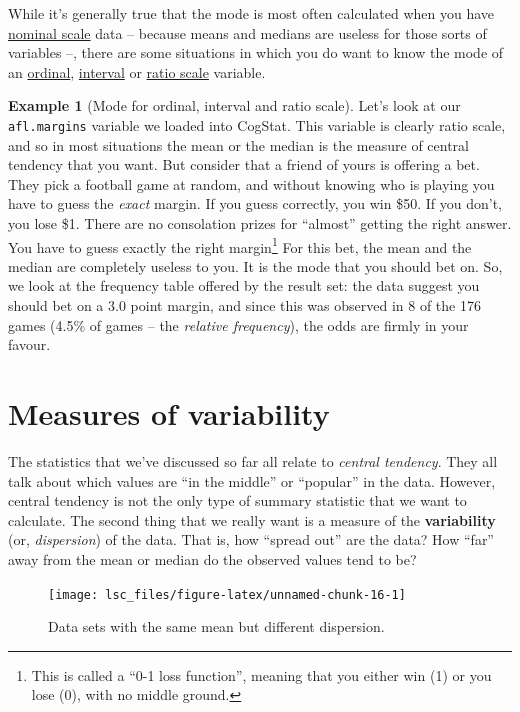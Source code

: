 \documentclass[
  11pt,
]{book}
\theoremstyle{definition}
\theoremstyle{definition}
\newtheorem{example}{Example}[chapter]
\theoremstyle{definition}
\theoremstyle{definition}
\theoremstyle{remark}
\begin{document}
While it's generally true that the mode is most often calculated when you have \protect\hyperlink{nominalscale}{nominal scale} data -- because means and medians are useless for those sorts of variables --, there are some situations in which you do want to know the mode of an \protect\hyperlink{ordinalscale}{ordinal}, \protect\hyperlink{intervalscale}{interval} or \protect\hyperlink{ratioscale}{ratio scale} variable.

\begin{example}[Mode for ordinal, interval and ratio scale]
\protect\hypertarget{exm:exmode2}{}\label{exm:exmode2}Let's look at our \texttt{afl.margins} variable we loaded into CogStat. This variable is clearly ratio scale, and so in most situations the mean or the median is the measure of central tendency that you want. But consider that a friend of yours is offering a bet. They pick a football game at random, and without knowing who is playing you have to guess the \emph{exact} margin. If you guess correctly, you win \$50. If you don't, you lose \$1. There are no consolation prizes for ``almost'' getting the right answer. You have to guess exactly the right margin\footnote{This is called a ``0-1 loss function'', meaning that you either win (1) or you lose (0), with no middle ground.} For this bet, the mean and the median are completely useless to you. It is the mode that you should bet on. So, we look at the frequency table offered by the result set: the data suggest you should bet on a \(3.0\) point margin, and since this was observed in 8 of the 176 games (4.5\% of games -- the \emph{relative frequency}), the odds are firmly in your favour.
\end{example}

\hypertarget{var}{%
\section{Measures of variability}\label{var}}

The statistics that we've discussed so far all relate to \emph{central tendency}. They all talk about which values are ``in the middle'' or ``popular'' in the data. However, central tendency is not the only type of summary statistic that we want to calculate. The second thing that we really want is a measure of the \textbf{variability} (or, \emph{dispersion}) of the data. That is, how ``spread out'' are the data? How ``far'' away from the mean or median do the observed values tend to be?

\begin{figure}

{\centering \texttt{[image: lsc\_files/figure-latex/unnamed-chunk-16-1]} 

}

\caption{Data sets with the same mean but different dispersion.}\label{fig:unnamed-chunk-16}
\end{figure}
\end{document}
